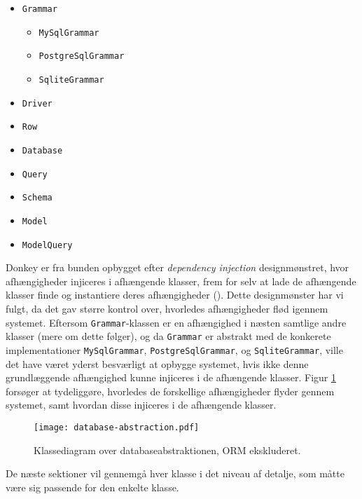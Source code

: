 \begin{multicols}{3}
\begin{itemize}
  \item \texttt{Grammar}
    \begin{itemize}
      \item \texttt{MySqlGrammar}
      \item \texttt{PostgreSqlGrammar}
      \item \texttt{SqliteGrammar}
    \end{itemize}
  \item \texttt{Driver}
  \item \texttt{Row}
  \item \texttt{Database}
  \item \texttt{Query}
  \item \texttt{Schema}
  \item \texttt{Model}
  \item \texttt{ModelQuery}
\end{itemize}
\end{multicols}

Donkey er fra bunden opbygget efter \textit{dependency injection} designmønstret, hvor afhængigheder injiceres i afhængende klasser, frem for selv at lade de afhængende klasser finde og instantiere deres afhængigheder (\cite{wiki:di}). Dette designmønster har vi fulgt, da det gav større kontrol over, hvorledes afhængigheder flød igennem systemet. Eftersom \texttt{Grammar}-klassen er en afhængighed i næsten samtlige andre klasser (mere om dette følger), og da \texttt{Grammar} er abstrakt med de konkerete implementationer \texttt{My\-Sql\-Grammar}, \texttt{Postgre\-Sql\-Grammar}, og \texttt{Sqlite\-Grammar}, ville det have været yderst besværligt at opbygge systemet, hvis ikke denne grundlæggende afhængighed kunne injiceres i de afhængende klasser. Figur \ref{class-diagram:database-abstraction} forsøger at tydeliggøre, hvorledes de forskellige afhængigheder flyder gennem systemet, samt hvordan disse injiceres i de afhængende klasser.

\begin{figure}[h]
  \centering
  \texttt{[image: database-abstraction.pdf]}
  \caption{Klassediagram over databaseabstraktionen, ORM ekskluderet.}
  \label{class-diagram:database-abstraction}
\end{figure}

De næste sektioner vil gennemgå hver klasse i det niveau af detalje, som måtte være sig passende for den enkelte klasse.

